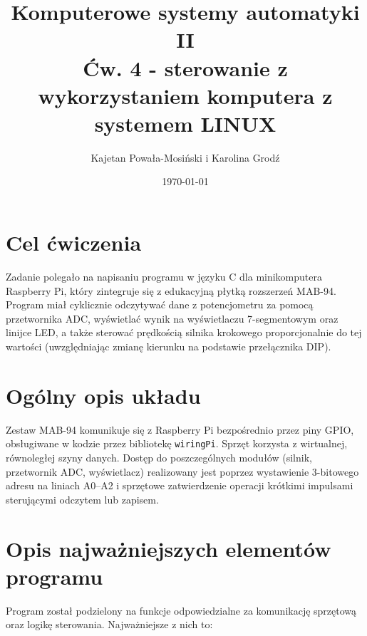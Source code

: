 \documentclass[11pt, a4paper]{article}
\title{\textbf{Komputerowe systemy automatyki II }\\Ćw. 4 - sterowanie z wykorzystaniem komputera z systemem LINUX}
\author{Kajetan Powała-Mosiński i Karolina Grodź}
\date{\today}
\begin{document}
\maketitle

\section{Cel ćwiczenia}
Zadanie polegało na napisaniu programu w języku C dla minikomputera Raspberry Pi, który zintegruje się z edukacyjną płytką rozszerzeń MAB-94. Program miał cyklicznie odczytywać dane z potencjometru za pomocą przetwornika ADC, wyświetlać wynik na wyświetlaczu 7-segmentowym oraz linijce LED, a także sterować prędkością silnika krokowego proporcjonalnie do tej wartości (uwzględniając zmianę kierunku na podstawie przełącznika DIP).

\section{Ogólny opis układu}
Zestaw MAB-94 komunikuje się z Raspberry Pi bezpośrednio przez piny GPIO, obsługiwane w kodzie przez bibliotekę \texttt{wiringPi}. Sprzęt korzysta z wirtualnej, równoległej szyny danych. Dostęp do poszczególnych modułów (silnik, przetwornik ADC, wyświetlacz) realizowany jest poprzez wystawienie 3-bitowego adresu na liniach A0--A2 i sprzętowe zatwierdzenie operacji krótkimi impulsami sterującymi odczytem lub zapisem.

\section{Opis najważniejszych elementów programu}
Program został podzielony na funkcje odpowiedzialne za komunikację sprzętową oraz logikę sterowania. Najważniejsze z nich to:
\end{document}
